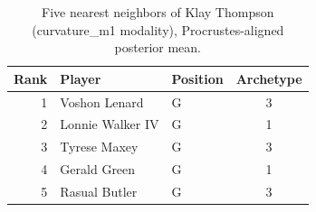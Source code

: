 \begin{table}[htbp]
  \centering\small
  \begin{tabular}{rllc}
    \toprule
    Rank & Player & Position & Archetype \\
    \midrule
    1 & Voshon Lenard & G & 3 \\
    2 & Lonnie Walker IV & G & 1 \\
    3 & Tyrese Maxey & G & 3 \\
    4 & Gerald Green & G & 1 \\
    5 & Rasual Butler & G & 3 \\
    \bottomrule
  \end{tabular}
  \caption{Five nearest neighbors of Klay Thompson (curvature_m1 modality), Procrustes-aligned posterior mean.}
  \label{tab:Klay_Thompson_neighbors_curvature_m1}
\end{table}

